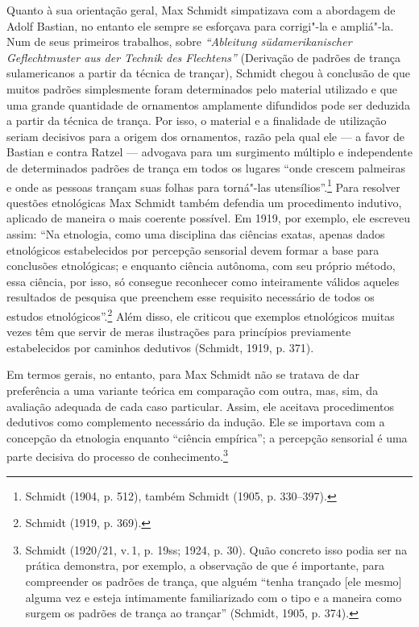 Quanto à sua orientação geral, Max Schmidt simpatizava com a abordagem
de Adolf Bastian, no entanto ele sempre se esforçava para corrigi"-la e
ampliá"-la. Num de seus primeiros trabalhos, sobre \emph{``Ableitung
südamerikanischer Geflechtmuster aus der Technik des Flechtens''}
(Derivação de padrões de trança sulamericanos a partir da técnica de
trançar), Schmidt chegou à conclusão de que muitos padrões simplesmente
foram determinados pelo material utilizado e que uma grande quantidade
de ornamentos amplamente difundidos pode ser deduzida a partir da
técnica de trança. Por isso, o material e a finalidade de utilização
seriam decisivos para a origem dos ornamentos, razão pela qual ele --- a
favor de Bastian e contra Ratzel --- advogava para um surgimento múltiplo
e independente de determinados padrões de trança em todos os lugares
``onde crescem palmeiras e onde as pessoas trançam suas folhas para
torná"-las utensílios''.\footnote{Schmidt (1904, p. 512), também Schmidt
  (1905, p. 330--397).} Para resolver questões etnológicas Max Schmidt
também defendia um procedimento indutivo, aplicado de maneira o mais
coerente possível. Em 1919, por exemplo, ele escreveu assim: ``Na
etnologia, como uma disciplina das ciências exatas, apenas dados
etnológicos estabelecidos por percepção sensorial devem formar a base
para conclusões etnológicas; e enquanto ciência autônoma, com seu
próprio método, essa ciência, por isso, só consegue reconhecer como
inteiramente válidos aqueles resultados de pesquisa que preenchem esse
requisito necessário de todos os estudos etnológicos''.\footnote{Schmidt
  (1919, p. 369).} Além disso, ele criticou que exemplos etnológicos
muitas vezes têm que servir de meras ilustrações para princípios
previamente estabelecidos por caminhos dedutivos (Schmidt, 1919, p.
371).

Em termos gerais, no entanto, para Max Schmidt não se tratava de dar
preferência a uma variante teórica em comparação com outra, mas, sim,
da avaliação adequada de cada caso particular. Assim, ele aceitava
procedimentos dedutivos como complemento necessário da indução. Ele se
importava com a concepção da etnologia enquanto ``ciência empírica''; a
percepção sensorial é uma parte decisiva do processo de
conhecimento.\footnote{Schmidt (1920/21, v.\,1, p. 19ss; 1924, p. 30).
  Quão concreto isso podia ser na prática demonstra, por exemplo, a
  observação de que é importante, para compreender os padrões de trança,
  que alguém ``tenha trançado {[}ele mesmo{]} alguma vez e esteja
  intimamente familiarizado com o tipo e a maneira como surgem os
  padrões de trança ao trançar'' (Schmidt, 1905, p. 374).}


